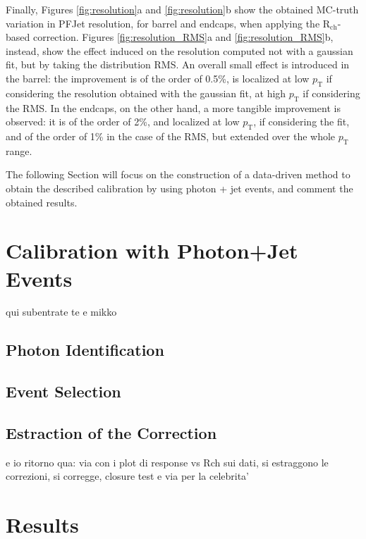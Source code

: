 \documentclass{cmspaper}
\begin{document}
Finally, Figures \ref{fig:resolution}a and \ref{fig:resolution}b show the obtained MC-truth variation in PFJet resolution, for barrel and endcaps, when applying the R$_{\mathrm{ch}}$-based correction. Figures \ref{fig:resolution_RMS}a and \ref{fig:resolution_RMS}b, instead, show the effect induced on the resolution computed not with a gaussian fit, but by taking the distribution RMS. An overall small effect is introduced in the barrel: the improvement is of the order of 0.5\%, is localized at low $p_{\mathrm{T}}$ if considering the resolution obtained with the gaussian fit, at high $p_{\mathrm{T}}$ if considering the RMS. In the endcaps, on the other hand, a more tangible improvement is observed: it is of the order of 2\%, and localized at low $p_{\mathrm{T}}$, if considering the fit, and of the order of 1\% in the case of the RMS, but extended over the whole $p_{\mathrm{T}}$ range.
 
The following Section will focus on the construction of a data-driven method to obtain the described calibration by using photon + jet events, and comment the obtained results.







\section{Calibration with Photon+Jet Events}
\label{sec:photJet}

qui subentrate te e mikko


\subsection{Photon Identification}


\subsection{Event Selection}



\subsection{Estraction of the Correction}

e io ritorno qua: via con i plot di response vs Rch sui dati, si estraggono le correzioni, si corregge, closure test e via per la celebrita'




\section{Results}
\end{document}
